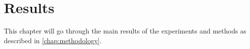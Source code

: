 \chapter{Results}
\label{chap:results}
This chapter will go through the main results of the experiments and methods as described in \autoref{chap:methodology}. 




